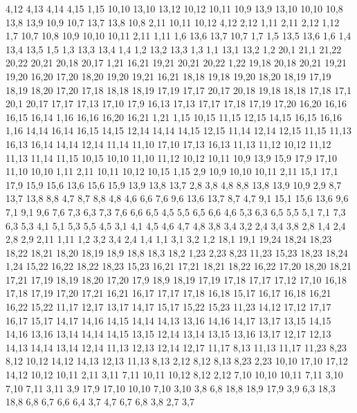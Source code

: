 4,12
4,13
4,14
4,15
1,15
%
10,10
13,10
13,12
10,12
10,11
%
10,9
13,9
13,10
10,10
%
10,8
13,8
13,9
10,9
%
10,7
13,7
13,8
10,8
%
2,11
10,11
10,12
4,12
2,12
%
1,11
2,11
2,12
1,12
%
1,7
10,7
10,8
10,9
10,10
10,11
2,11
1,11
%
1,6
13,6
13,7
10,7
1,7
%
1,5
13,5
13,6
1,6
%
1,4
13,4
13,5
1,5
%
1,3
13,3
13,4
1,4
%
1,2
13,2
13,3
1,3
%
1,1
13,1
13,2
1,2
20,1
21,1
21,22
20,22
20,21
20,18
20,17
%
1,21
16,21
19,21
20,21
20,22
1,22
%
19,18
20,18
20,21
19,21
19,20
%
16,20
17,20
18,20
19,20
19,21
16,21
%
18,18
19,18
19,20
18,20
18,19
%
17,19
18,19
18,20
17,20
%
17,18
18,18
18,19
17,19
%
17,17
20,17
20,18
19,18
18,18
17,18
%
17,1
20,1
20,17
17,17
17,13
17,10
17,9
%
16,13
17,13
17,17
17,18
17,19
17,20
16,20
16,16
16,15
16,14
%
1,16
16,16
16,20
16,21
1,21
%
1,15
10,15
11,15
12,15
14,15
16,15
16,16
1,16
%
14,14
16,14
16,15
14,15
%
12,14
14,14
14,15
12,15
%
11,14
12,14
12,15
11,15
%
11,13
16,13
16,14
14,14
12,14
11,14
%
11,10
17,10
17,13
16,13
11,13
11,12
%
10,12
11,12
11,13
11,14
11,15
10,15
%
10,10
11,10
11,12
10,12
10,11
%
10,9
13,9
15,9
17,9
17,10
11,10
10,10
%
1,11
2,11
10,11
10,12
10,15
1,15
%
2,9
10,9
10,10
10,11
2,11
%
15,1
17,1
17,9
15,9
15,6
%
13,6
15,6
15,9
13,9
13,8
13,7
%
2,8
3,8
4,8
8,8
13,8
13,9
10,9
2,9
%
8,7
13,7
13,8
8,8
%
4,7
8,7
8,8
4,8
%
4,6
6,6
7,6
9,6
13,6
13,7
8,7
4,7
%
9,1
15,1
15,6
13,6
9,6
%
7,1
9,1
9,6
7,6
7,3
%
6,3
7,3
7,6
6,6
6,5
%
4,5
5,5
6,5
6,6
4,6
%
5,3
6,3
6,5
5,5
%
5,1
7,1
7,3
6,3
5,3
%
4,1
5,1
5,3
5,5
4,5
%
3,1
4,1
4,5
4,6
4,7
4,8
3,8
3,4
3,2
%
2,4
3,4
3,8
2,8
%
1,4
2,4
2,8
2,9
2,11
1,11
%
1,2
3,2
3,4
2,4
1,4
%
1,1
3,1
3,2
1,2
18,1
19,1
19,24
18,24
18,23
18,22
18,21
18,20
18,19
18,9
18,8
18,3
18,2
%
1,23
2,23
8,23
11,23
15,23
18,23
18,24
1,24
%
15,22
16,22
18,22
18,23
15,23
%
16,21
17,21
18,21
18,22
16,22
%
17,20
18,20
18,21
17,21
%
17,19
18,19
18,20
17,20
%
17,9
18,9
18,19
17,19
17,18
17,17
17,12
17,10
%
16,18
17,18
17,19
17,20
17,21
16,21
%
16,17
17,17
17,18
16,18
%
15,17
16,17
16,18
16,21
16,22
15,22
%
11,17
12,17
13,17
14,17
15,17
15,22
15,23
11,23
%
14,12
17,12
17,17
16,17
15,17
14,17
14,16
14,15
14,14
14,13
%
13,16
14,16
14,17
13,17
%
13,15
14,15
14,16
13,16
%
13,14
14,14
14,15
13,15
%
12,14
13,14
13,15
13,16
13,17
12,17
%
12,13
14,13
14,14
13,14
12,14
%
11,13
12,13
12,14
12,17
11,17
%
8,13
11,13
11,17
11,23
8,23
%
8,12
10,12
14,12
14,13
12,13
11,13
8,13
%
2,12
8,12
8,13
8,23
2,23
%
10,10
17,10
17,12
14,12
10,12
10,11
%
2,11
3,11
7,11
10,11
10,12
8,12
2,12
%
7,10
10,10
10,11
7,11
%
3,10
7,10
7,11
3,11
%
3,9
17,9
17,10
10,10
7,10
3,10
%
3,8
6,8
18,8
18,9
17,9
3,9
%
6,3
18,3
18,8
6,8
6,7
6,6
6,4
%
3,7
4,7
6,7
6,8
3,8
%
2,7
3,7
